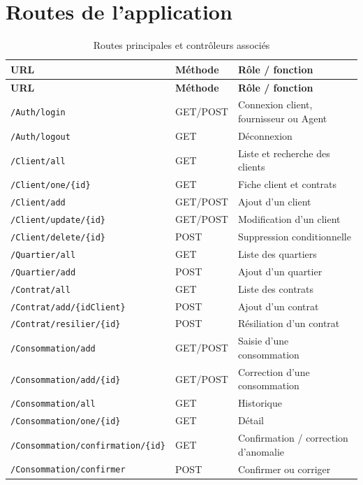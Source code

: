 \chapter{Routes de l'application}

{\small
\begin{longtable}{>{\raggedright\arraybackslash}p{}p{}>{\raggedright\arraybackslash}p{}}
\caption{Routes principales et contrôleurs associés}\label{tab:routes}\\
\toprule
\textbf{URL} & \textbf{Méthode} & \textbf{Rôle / fonction} \\
\midrule
\endfirsthead
\toprule
\textbf{URL} & \textbf{Méthode} & \textbf{Rôle / fonction} \\
\midrule
\endhead
\texttt{/Auth/login} & GET/POST & Connexion client, fournisseur ou Agent \\
\texttt{/Auth/logout} & GET & Déconnexion \\
\texttt{/Client/all} & GET & Liste et recherche des clients \\
\texttt{/Client/one/\{id\}} & GET & Fiche client et contrats \\
\texttt{/Client/add} & GET/POST & Ajout d'un client \\
\texttt{/Client/update/\{id\}} & GET/POST & Modification d'un client \\
\texttt{/Client/delete/\{id\}} & POST & Suppression conditionnelle \\
\texttt{/Quartier/all} & GET & Liste des quartiers \\
\texttt{/Quartier/add} & POST & Ajout d'un quartier \\
\texttt{/Contrat/all} & GET & Liste des contrats \\
\texttt{/Contrat/add/\{idClient\}} & POST & Ajout d'un contrat \\
\texttt{/Contrat/resilier/\{id\}} & POST & Résiliation d'un contrat \\
\texttt{/Consommation/add} & GET/POST & Saisie d'une consommation \\
\texttt{/Consommation/add/\{id\}} & GET/POST & Correction d'une consommation \\
\texttt{/Consommation/all} & GET & Historique \\
\texttt{/Consommation/one/\{id\}} & GET & Détail \\
\texttt{/Consommation/confirmation/\{id\}} & GET & Confirmation / correction d'anomalie \\
\texttt{/Consommation/confirmer} & POST & Confirmer ou corriger \\

\end{longtable}}
